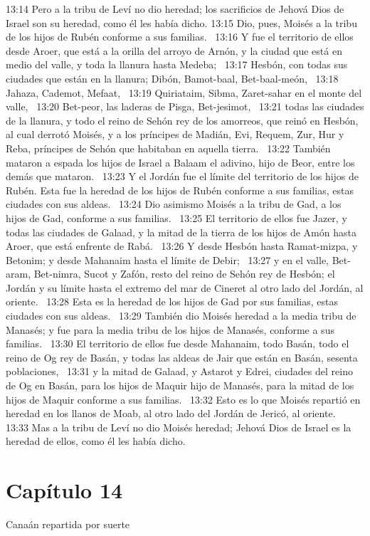 13:14 Pero a la tribu de Leví no dio heredad; los sacrificios de Jehová Dios de Israel son su heredad, como él les había dicho. 
13:15 Dio, pues, Moisés a la tribu de los hijos de Rubén conforme a sus familias.  
13:16 Y fue el territorio de ellos desde Aroer, que está a la orilla del arroyo de Arnón, y la ciudad que está en medio del valle, y toda la llanura hasta Medeba;  
13:17 Hesbón, con todas sus ciudades que están en la llanura; Dibón, Bamot-baal, Bet-baal-meón,  
13:18 Jahaza, Cademot, Mefaat,  
13:19 Quiriataim, Sibma, Zaret-sahar en el monte del valle,  
13:20 Bet-peor, las laderas de Pisga, Bet-jesimot,  
13:21 todas las ciudades de la llanura, y todo el reino de Sehón rey de los amorreos, que reinó en Hesbón, al cual derrotó Moisés, y a los príncipes de Madián, Evi, Requem, Zur, Hur y Reba, príncipes de Sehón que habitaban en aquella tierra.  
13:22 También mataron a espada los hijos de Israel a Balaam el adivino, hijo de Beor, entre los demás que mataron.  
13:23 Y el Jordán fue el límite del territorio de los hijos de Rubén. Esta fue la heredad de los hijos de Rubén conforme a sus familias, estas ciudades con sus aldeas.  
13:24 Dio asimismo Moisés a la tribu de Gad, a los hijos de Gad, conforme a sus familias.  
13:25 El territorio de ellos fue Jazer, y todas las ciudades de Galaad, y la mitad de la tierra de los hijos de Amón hasta Aroer, que está enfrente de Rabá.  
13:26 Y desde Hesbón hasta Ramat-mizpa, y Betonim; y desde Mahanaim hasta el límite de Debir;  
13:27 y en el valle, Bet-aram, Bet-nimra, Sucot y Zafón, resto del reino de Sehón rey de Hesbón; el Jordán y su límite hasta el extremo del mar de Cineret al otro lado del Jordán, al oriente.  
13:28 Esta es la heredad de los hijos de Gad por sus familias, estas ciudades con sus aldeas.  
13:29 También dio Moisés heredad a la media tribu de Manasés; y fue para la media tribu de los hijos de Manasés, conforme a sus familias.  
13:30 El territorio de ellos fue desde Mahanaim, todo Basán, todo el reino de Og rey de Basán, y todas las aldeas de Jair que están en Basán, sesenta poblaciones,  
13:31 y la mitad de Galaad, y Astarot y Edrei, ciudades del reino de Og en Basán, para los hijos de Maquir hijo de Manasés, para la mitad de los hijos de Maquir conforme a sus familias.  
13:32 Esto es lo que Moisés repartió en heredad en los llanos de Moab, al otro lado del Jordán de Jericó, al oriente.  
13:33 Mas a la tribu de Leví no dio Moisés heredad; Jehová Dios de Israel es la heredad de ellos, como él les había dicho. 
\section*{Capítulo 14}
Canaán repartida por suerte  

